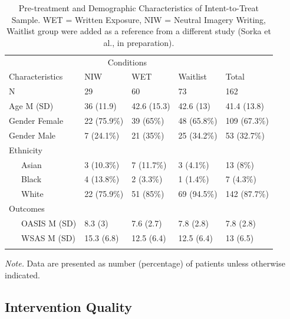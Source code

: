 \documentclass[
  man,floatsintext]{apa7}
\begin{document}
\begin{table}[tbp]

\begin{center}
\begin{threeparttable}

\caption{\label{tab:demographics}Pre-treatment and Demographic Characteristics of Intent-to-Treat Sample. WET = Written Exposure, NIW = Neutral Imagery Writing, Waitlist group were added as a reference from a different study (Sorka et al., in preparation).}

\begin{tabular}{lllll}
\toprule
 & \multicolumn{2}{c}{Conditions}  &\\
\cmidrule(r){2-4}
Characteristics & NIW & WET & Waitlist & Total\\
\midrule
N & 29 & 60 & 73 & 162\\
Age M (SD) & 36 (11.9) & 42.6 (15.3) & 42.6 (13) & 41.4 (13.8)\\
Gender Female & 22 (75.9\%) & 39 (65\%) & 48 (65.8\%) & 109 (67.3\%)\\
Gender Male & 7 (24.1\%) & 21 (35\%) & 25 (34.2\%) & 53 (32.7\%)\\
Ethnicity &  &  &  & \\
\ \ \ Asian & 3 (10.3\%) & 7 (11.7\%) & 3 (4.1\%) & 13 (8\%)\\
\ \ \ Black & 4 (13.8\%) & 2 (3.3\%) & 1 (1.4\%) & 7 (4.3\%)\\
\ \ \ White & 22 (75.9\%) & 51 (85\%) & 69 (94.5\%) & 142 (87.7\%)\\
Outcomes &  &  &  & \\
\ \ \ OASIS M (SD) & 8.3 (3) & 7.6 (2.7) & 7.8 (2.8) & 7.8 (2.8)\\
\ \ \ WSAS M (SD) & 15.3 (6.8) & 12.5 (6.4) & 12.5 (6.4) & 13 (6.5)\\
\bottomrule
\addlinespace
\end{tabular}

\begin{tablenotes}[para]
\normalsize{\textit{Note.} Data are presented as number (percentage) of patients unless otherwise indicated.}
\end{tablenotes}

\end{threeparttable}
\end{center}

\end{table}

\subsection{Intervention Quality}\label{intervention-quality}
\end{document}

